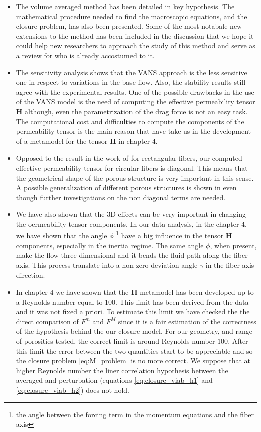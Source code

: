 \begin{itemize}

\item The volume averaged method has been detailed in key hypothesis. The mathematical procedure needed to find the macroscopic equations, and the closure 
problem, has also been presented. Some of the most notabale new extensions to the method has been included in the discussion that we hope it could help new  
researchers to approach the study of this method and serve as a review for who is already accostumed to it.

\item The sensitivity analysis shows that the VANS approach is the less sensitive one in respect to variations in the base flow. Also, the stability results
 still agree with the experimental results. One of the possible drawbacks in the use of the VANS model is the need of computing the effective permeability 
 tensor $\mathbf{H}$ although, even the parametrization of the drag force is not an easy task. The computational cost and difficulties to compute the 
 components of the permeability tensor is the main reason that have take us in the development of a metamodel for the tensor $\mathbf{H}$ in chapter 4.
 
\item Opposed to the result in the work of \citet{lasseux} for rectangular fibers, our computed effective permeability tensor for circular fibers is diagonal.
 This means that the geometrical shape of the porous structure is very important in this sense. A possible generalization of different porous structures is 
 shown in \citet{pauthenet} even though further investigations on the non diagonal terms are needed.

\item We have also shown that the 3D effects can be very important in changing the oermeability tensor components. In our data analysis, in the chapter 4, 
we have shown that the angle $\phi$ \footnote{the angle between the forcing term in the momentum equations and the fiber axis} have a big influence in the 
tensor $\mathbf{H}$ components, especially in the inertia regime.
The same angle $\phi$, when present, make the flow three dimensional and it bends the fluid path along the fiber axis. This process translate into a non zero
deviation angle $\gamma$ in the fiber axis direction.

\item In chapter 4 we have shown that the $\mathbf{H}$ metamodel has been developed up to a Reynolds number equal to $100$. This limit has been derived 
from the data and it was not fixed a priori. To estimate this limit we have checked the the direct comparison of $F^m$ and $F^M$ since it is a fair 
estimation of the correctness of the hypothesis behind the our closure model. For our geometry, and range of porosities tested, the correct limit is around 
Reynolds number $100$. After this limit the error between the two quantities start to be appreciable and so the closure problem \eqref{eq:M_problem} is no more
 correct. We suppose that at higher Reynolds number the liner correlation hypothesis between the averaged and perturbation (equations \eqref{eq:closure_viab_h1} and \eqref{eq:closure_viab_h2}) does not hold.


\end{itemize}
